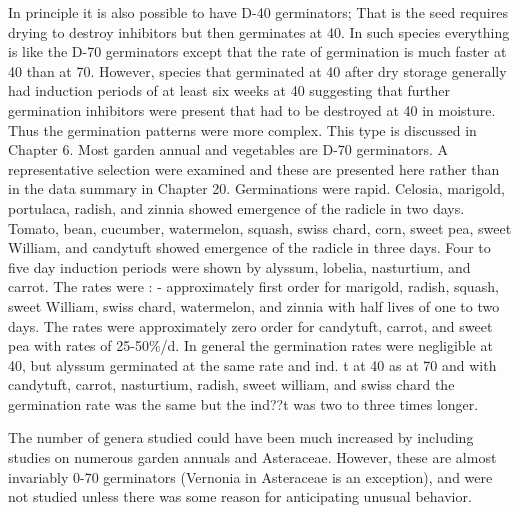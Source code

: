 In principle it is also possible to have D-40 germinators; That is the seed
requires drying to destroy inhibitors but then germinates at 40. In such species
everything is like the D-70 germinators except that the rate of germination is much
faster at 40 than at 70. However, species that germinated at 40 after dry storage
generally had induction periods of at least six weeks at 40 suggesting that further
germination inhibitors were present that had to be destroyed at 40 in moisture. Thus
the germination patterns were more complex. This type is discussed in Chapter 6.
Most garden annual and vegetables are D-70 germinators. A representative
selection were examined and these are presented here rather than in the data
summary in Chapter 20. Germinations were rapid. Celosia, marigold, portulaca,
radish, and zinnia showed emergence of the radicle in two days. Tomato, bean,
cucumber, watermelon, squash, swiss chard, corn, sweet pea, sweet William, and
candytuft showed emergence of the radicle in three days. Four to five day induction
periods were shown by alyssum, lobelia, nasturtium, and carrot. The rates were : -
approximately first order for marigold, radish, squash, sweet William, swiss chard,
watermelon, and zinnia with half lives of one to two days. The rates were
approximately zero order for candytuft, carrot, and sweet pea with rates of 25-50\%/d.
In general the germination rates were negligible at 40, but alyssum germinated at the
same rate and ind. t at 40 as at 70 and with candytuft, carrot, nasturtium, radish, sweet
william, and swiss chard the germination rate was the same but the ind??t was two to
three times longer.

The number of genera studied could have been much increased by including
studies on numerous garden annuals and Asteraceae. However, these are almost
invariably 0-70 germinators (Vernonia in Asteraceae is an exception), and were not
studied unless there was some reason for anticipating unusual behavior.

